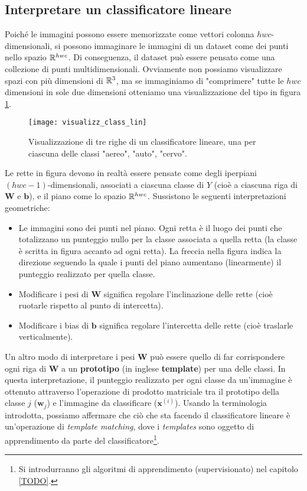 \subsection*{Interpretare un classificatore lineare}

Poiché le immagini possono essere memorizzate come vettori colonna $hwc$-dimensionali, si possono immaginare le immagini di un dataset come dei punti nello spazio $\mathbb{R}^{hwc}$. Di conseguenza, il dataset può essere pensato come una collezione di punti multidimensionali. Ovviamente non possiamo visualizzare spazi con più dimensioni di $\mathbb{R}^{3}$, ma se immaginiamo di "comprimere" tutte le $hwc$ dimensioni in sole due dimensioni otteniamo una visualizzazione del tipo in figura \ref{visual_class_lin}.

\begin{figure}[h]
\centering
\texttt{[image: visualizz\_class\_lin]}
\caption{Visualizzazione di tre righe di un classificatore lineare, una per ciascuna delle classi "aereo", "auto", "cervo".}
\label{visual_class_lin}
\end{figure}

Le rette in figura devono in realtà essere pensate come degli iperpiani $(hwc-1)$-dimensionali, associati a ciascuna classe di $Y$ (cioè a ciascuna riga di $\mathbf{W}$ e $\mathbf{b}$), e il piano come lo spazio $\mathbb{R}^{hwc}$. Sussistono le seguenti interpretazioni geometriche:
\begin{itemize}
\item Le immagini sono dei punti nel piano. Ogni retta è il luogo dei punti che totalizzano un punteggio nullo per la classe associata a quella retta (la classe è scritta in figura accanto ad ogni retta). La freccia nella figura indica la direzione seguendo la quale i punti del piano aumentano (linearmente) il punteggio realizzato per quella classe.
\item Modificare i pesi di $\mathbf{W}$ significa regolare l'inclinazione delle rette (cioè ruotarle rispetto al punto di intercetta).
\item Modificare i bias di $\mathbf{b}$ significa regolare l'intercetta delle rette (cioè traslarle verticalmente).
\end{itemize}

Un altro modo di interpretare i pesi $\mathbf{W}$ può essere quello di far corrispondere ogni riga di $\mathbf{W}$ a un \textbf{prototipo} (in inglese \textbf{template}) per una delle classi. In questa interpretazione, il punteggio realizzato per ogni classe da un'immagine è ottenuto attraverso l'operazione di prodotto matriciale tra il prototipo della classe $j$ ($\mathbf{w}_j$) e l'immagine da classificare ($\mathbf{x}^{(i)}$).
Usando la terminologia introdotta, possiamo affermare che ciò che sta facendo il classificatore lineare è un'operazione di \textit{template matching}, dove i \textit{templates} sono oggetto di apprendimento da parte del classificatore\footnote{Si introdurranno gli algoritmi di apprendimento (supervisionato) nel capitolo \ref{TODO}.}.

